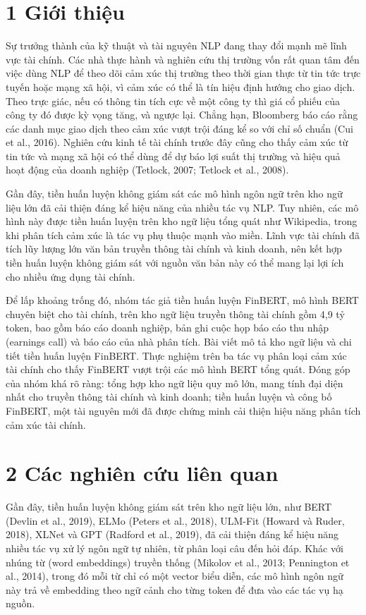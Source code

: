 \section{1 Giới thiệu}

Sự trưởng thành của kỹ thuật và tài nguyên NLP đang thay đổi mạnh mẽ lĩnh vực tài chính. Các nhà thực hành và nghiên cứu thị trường vốn rất quan tâm đến việc dùng NLP để theo dõi cảm xúc thị trường theo thời gian thực từ tin tức trực tuyến hoặc mạng xã hội, vì cảm xúc có thể là tín hiệu định hướng cho giao dịch. Theo trực giác, nếu có thông tin tích cực về một công ty thì giá cổ phiếu của công ty đó được kỳ vọng tăng, và ngược lại. Chẳng hạn, Bloomberg báo cáo rằng các danh mục giao dịch theo cảm xúc vượt trội đáng kể so với chỉ số chuẩn (Cui et al., 2016). Nghiên cứu kinh tế tài chính trước đây cũng cho thấy cảm xúc từ tin tức và mạng xã hội có thể dùng để dự báo lợi suất thị trường và hiệu quả hoạt động của doanh nghiệp (Tetlock, 2007; Tetlock et al., 2008).

Gần đây, tiền huấn luyện không giám sát các mô hình ngôn ngữ trên kho ngữ liệu lớn đã cải thiện đáng kể hiệu năng của nhiều tác vụ NLP. Tuy nhiên, các mô hình này được tiền huấn luyện trên kho ngữ liệu tổng quát như Wikipedia, trong khi phân tích cảm xúc là tác vụ phụ thuộc mạnh vào miền. Lĩnh vực tài chính đã tích lũy lượng lớn văn bản truyền thông tài chính và kinh doanh, nên kết hợp tiền huấn luyện không giám sát với nguồn văn bản này có thể mang lại lợi ích cho nhiều ứng dụng tài chính.

Để lấp khoảng trống đó, nhóm tác giả tiền huấn luyện FinBERT, mô hình BERT chuyên biệt cho tài chính, trên kho ngữ liệu truyền thông tài chính gồm 4,9 tỷ token, bao gồm báo cáo doanh nghiệp, bản ghi cuộc họp báo cáo thu nhập (earnings call) và báo cáo của nhà phân tích. Bài viết mô tả kho ngữ liệu và chi tiết tiền huấn luyện FinBERT. Thực nghiệm trên ba tác vụ phân loại cảm xúc tài chính cho thấy FinBERT vượt trội các mô hình BERT tổng quát. Đóng góp của nhóm khá rõ ràng: tổng hợp kho ngữ liệu quy mô lớn, mang tính đại diện nhất cho truyền thông tài chính và kinh doanh; tiền huấn luyện và công bố FinBERT, một tài nguyên mới đã được chứng minh cải thiện hiệu năng phân tích cảm xúc tài chính.

\section{2 Các nghiên cứu liên quan}

Gần đây, tiền huấn luyện không giám sát trên kho ngữ liệu lớn, như BERT (Devlin et al., 2019), ELMo (Peters et al., 2018), ULM-Fit (Howard và Ruder, 2018), XLNet và GPT (Radford et al., 2019), đã cải thiện đáng kể hiệu năng nhiều tác vụ xử lý ngôn ngữ tự nhiên, từ phân loại câu đến hỏi đáp. Khác với nhúng từ (word embeddings) truyền thống (Mikolov et al., 2013; Pennington et al., 2014), trong đó mỗi từ chỉ có một vector biểu diễn, các mô hình ngôn ngữ này trả về embedding theo ngữ cảnh cho từng token để đưa vào các tác vụ hạ nguồn.

